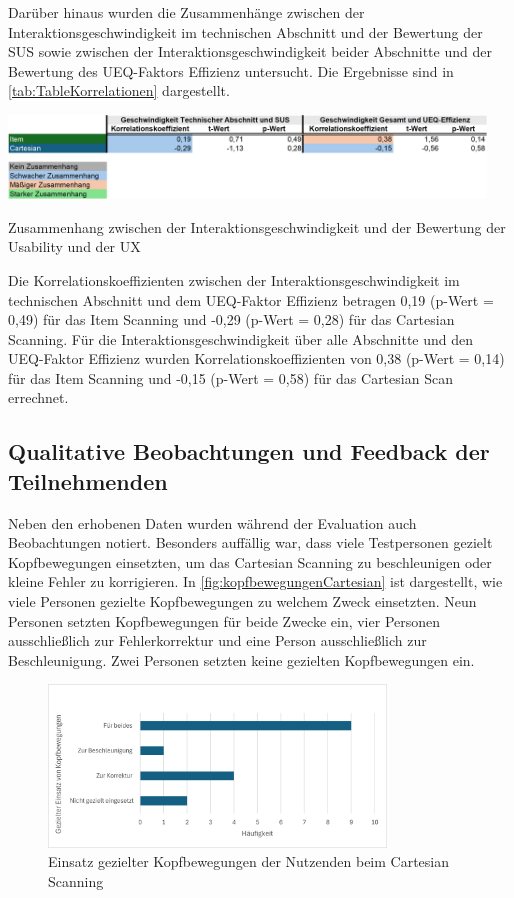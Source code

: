 Darüber hinaus wurden die Zusammenhänge zwischen der Interaktionsgeschwindigkeit im technischen Abschnitt und der Bewertung der SUS sowie zwischen der Interaktionsgeschwindigkeit beider Abschnitte und der Bewertung des UEQ-Faktors Effizienz untersucht. Die Ergebnisse sind in \autoref{tab:TableKorrelationen} dargestellt. 

\begin{table}[tbh]
    \centering
    \includegraphics[width=0.95\textwidth]{images/Results/Korrelationen-Rest.png}
    \caption{Zusammenhang zwischen der Interaktionsgeschwindigkeit und der Bewertung der Usability und der UX}
    \label{tab:TableKorrelationen}
\end{table}

Die Korrelationskoeffizienten zwischen der Interaktionsgeschwindigkeit im technischen Abschnitt und dem UEQ-Faktor Effizienz betragen 0,19 (p-Wert = 0,49) für das Item Scanning und -0,29 (p-Wert = 0,28) für das Cartesian Scanning. Für die Interaktionsgeschwindigkeit über alle Abschnitte und den UEQ-Faktor Effizienz wurden Korrelationskoeffizienten von 0,38 (p-Wert = 0,14) für das Item Scanning und -0,15 (p-Wert = 0,58) für das Cartesian Scan errechnet.

\subsection{Qualitative Beobachtungen und Feedback der Teilnehmenden}

Neben den erhobenen Daten wurden während der Evaluation auch Beobachtungen notiert. Besonders auffällig war, dass viele Testpersonen gezielt Kopfbewegungen einsetzten, um das Cartesian Scanning zu beschleunigen oder kleine Fehler zu korrigieren. In \autoref{fig:kopfbewegungenCartesian} ist dargestellt, wie viele Personen gezielte Kopfbewegungen zu welchem Zweck einsetzten. Neun Personen setzten Kopfbewegungen für beide Zwecke ein, vier Personen ausschließlich zur Fehlerkorrektur und eine Person ausschließlich zur Beschleunigung. Zwei Personen setzten keine gezielten Kopfbewegungen ein.

\begin{figure}[tbh]
    \centering
    \includegraphics[width=0.8\textwidth]{images/Results/EinsatzKopfbewegungen-Cartesian.png}
    \caption{Einsatz gezielter Kopfbewegungen der Nutzenden beim Cartesian Scanning}
    \label{fig:kopfbewegungenCartesian}
\end{figure}

